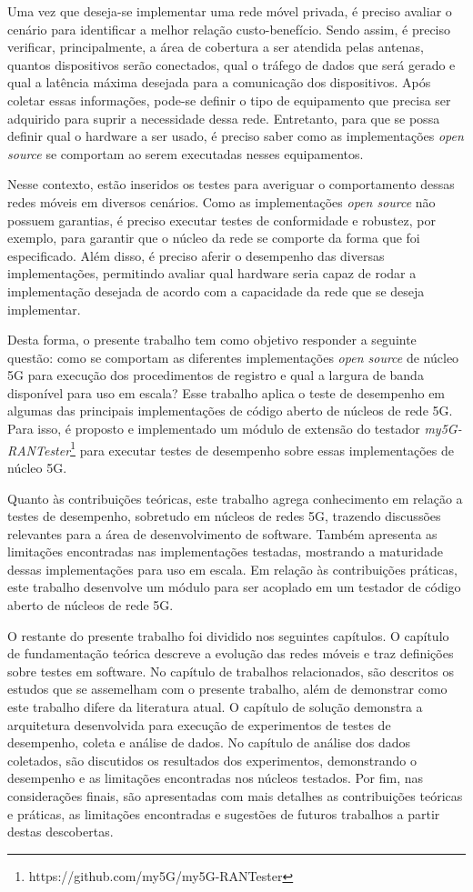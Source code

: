 Uma vez que deseja-se implementar uma rede móvel privada, é preciso avaliar o cenário para identificar a melhor relação custo-benefício.
Sendo assim, é preciso verificar, principalmente, a área de cobertura a ser atendida pelas antenas, quantos dispositivos serão conectados, qual o tráfego de dados que será gerado e qual a latência máxima desejada para a comunicação dos dispositivos.
Após coletar essas informações, pode-se definir o tipo de equipamento que precisa ser adquirido para suprir a necessidade dessa rede.
Entretanto, para que se possa definir qual o hardware a ser usado, é preciso saber como as implementações \textit{open source} se comportam ao serem executadas nesses equipamentos.

Nesse contexto, estão inseridos os testes para averiguar o comportamento dessas redes móveis em diversos cenários.
Como as implementações \textit{open source} não possuem garantias, é preciso executar testes de conformidade e robustez, por exemplo, para garantir que o núcleo da rede se comporte da forma que foi especificado.
Além disso, é preciso aferir o desempenho das diversas implementações, permitindo avaliar qual hardware seria capaz de rodar a implementação desejada de acordo com a capacidade da rede que se deseja implementar.

Desta forma, o presente trabalho tem como objetivo responder a seguinte questão: como se comportam as diferentes implementações \textit{open source} de núcleo 5G para execução dos procedimentos de registro e qual a largura de banda disponível para uso em escala?
Esse trabalho aplica o teste de desempenho em algumas das principais implementações de código aberto de núcleos de rede 5G. Para isso, é proposto e implementado um módulo de extensão do testador \textit{my5G-RANTester}\footnote{https://github.com/my5G/my5G-RANTester} para executar testes de desempenho sobre essas implementações de núcleo 5G.

Quanto às contribuições teóricas, este trabalho agrega conhecimento em relação a testes de desempenho, sobretudo em núcleos de redes 5G, trazendo discussões relevantes para a área de desenvolvimento de software.
Também apresenta as limitações encontradas nas implementações testadas, mostrando a maturidade dessas implementações para uso em escala.
Em relação às contribuições práticas, este trabalho desenvolve um módulo para ser acoplado em um testador de código aberto de núcleos de rede 5G.

O restante do presente trabalho foi dividido nos seguintes capítulos.
O capítulo de fundamentação teórica descreve a evolução das redes móveis e traz definições sobre testes em software.
No capítulo de trabalhos relacionados, são descritos os estudos que se assemelham com o presente trabalho, além de demonstrar como este trabalho difere da literatura atual.
O capítulo de solução demonstra a arquitetura desenvolvida para execução de experimentos de testes de desempenho, coleta e análise de dados.
No capítulo de análise dos dados coletados, são discutidos os resultados dos experimentos, demonstrando o desempenho e as limitações encontradas nos núcleos testados.
Por fim, nas considerações finais, são apresentadas com mais detalhes as contribuições teóricas e práticas, as limitações encontradas e sugestões de futuros trabalhos a partir destas descobertas.
